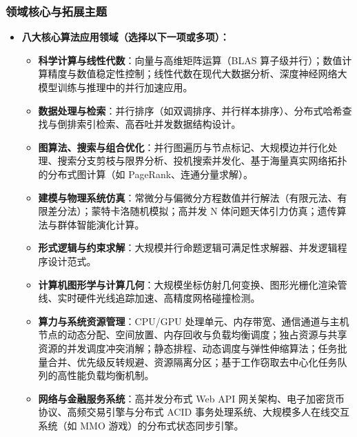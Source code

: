 \subsubsection{领域核心与拓展主题}
\begin{itemize}
    \item \textbf{八大核心算法应用领域（选择以下一项或多项）：}
    \begin{itemize}
        \item \textbf{科学计算与线性代数}：向量与高维矩阵运算（BLAS 算子级并行）；数值计算精度与数值稳定性控制；线性代数在现代大数据分析、深度神经网络大模型训练与推理中的并行加速应用。
        \item \textbf{数据处理与检索}：并行排序（如双调排序、并行样本排序）、分布式哈希查找与倒排索引检索、高吞吐并发数据结构设计。
        \item \textbf{图算法、搜索与组合优化}：并行图遍历与节点标记、大规模边并行化处理、搜索分支剪枝与限界分析、投机搜索并发化、基于海量真实网络拓扑的分布式图计算（如 PageRank、连通分量求解）。
        \item \textbf{建模与物理系统仿真}：常微分与偏微分方程数值并行解法（有限元法、有限差分法）；蒙特卡洛随机模拟；高并发 N 体问题天体引力仿真；遗传算法与群体智能演化计算。
        \item \textbf{形式逻辑与约束求解}：大规模并行命题逻辑可满足性求解器、并发逻辑程序设计范式。
        \item \textbf{计算机图形学与计算几何}：大规模坐标仿射几何变换、图形光栅化渲染管线、实时硬件光线追踪加速、高精度网格碰撞检测。
        \item \textbf{算力与系统资源管理}：CPU/GPU 处理单元、内存带宽、通信通道与主机节点的动态分配、空间放置、内存回收与负载均衡调度；独占资源与共享资源的并发调度冲突消解；静态排程、动态调度与弹性伸缩算法；任务批量合并、优先级反转规避、资源隔离分区；基于工作窃取去中心化任务队列的高性能负载均衡机制。
        \item \textbf{网络与金融服务系统}：高并发分布式 Web API 网关架构、电子加密货币协议、高频交易引擎与分布式 ACID 事务处理系统、大规模多人在线交互系统（如 MMO 游戏）的分布式状态同步引擎。
    \end{itemize}
\end{itemize}

